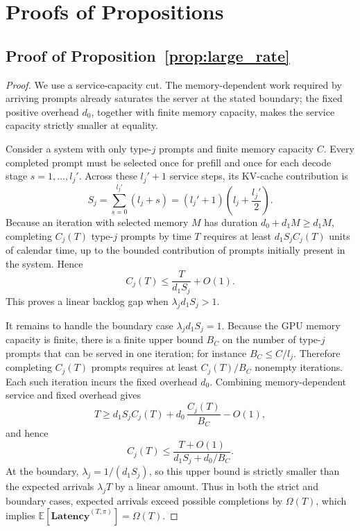 

\section{Proofs of Propositions}

\subsection{Proof of Proposition~\ref{prop:large_rate}}
\label{appendix:proof_large_rate}

\begin{proof}
We use a service-capacity cut. The memory-dependent work required by arriving prompts already saturates the server at the stated boundary; the fixed positive overhead \(d_0\), together with finite memory capacity, makes the service capacity strictly smaller at equality.

Consider a system with only type-\(j\) prompts and finite memory capacity \(C\). Every completed prompt must be selected once for prefill and once for each decode stage \(s=1,\ldots,l_j'\). Across these \(l_j'+1\) service steps, its KV-cache contribution is
\[
    S_j=\sum_{s=0}^{l_j'}(l_j+s)=(l_j'+1)\left(l_j+\frac{l_j'}{2}\right).
\]
Because an iteration with selected memory \(M\) has duration \(d_0+d_1M\ge d_1M\), completing \(C_j(T)\) type-\(j\) prompts by time \(T\) requires at least \(d_1S_j C_j(T)\) units of calendar time, up to the bounded contribution of prompts initially present in the system. Hence
\[
    C_j(T)\le \frac{T}{d_1S_j}+O(1).
\]
This proves a linear backlog gap when \(\lambda_jd_1S_j>1\).

It remains to handle the boundary case \(\lambda_jd_1S_j=1\). Because the GPU memory capacity is finite, there is a finite upper bound \(B_C\) on the number of type-\(j\) prompts that can be served in one iteration; for instance \(B_C\le C/l_j\). Therefore completing \(C_j(T)\) prompts requires at least \(C_j(T)/B_C\) nonempty iterations. Each such iteration incurs the fixed overhead \(d_0\). Combining memory-dependent service and fixed overhead gives
\[
    T \ge d_1S_j C_j(T)+d_0\,\frac{C_j(T)}{B_C}-O(1),
\]
and hence
\[
    C_j(T)\le \frac{T+O(1)}{d_1S_j+d_0/B_C}.
\]
At the boundary, \(\lambda_j=1/(d_1S_j)\), so this upper bound is strictly smaller than the expected arrivals \(\lambda_jT\) by a linear amount. Thus in both the strict and boundary cases, expected arrivals exceed possible completions by \(\Omega(T)\), which implies \(\mathbb{E}[\textbf{Latency}^{(T,\pi)}]=\Omega(T)\).
\end{proof}


